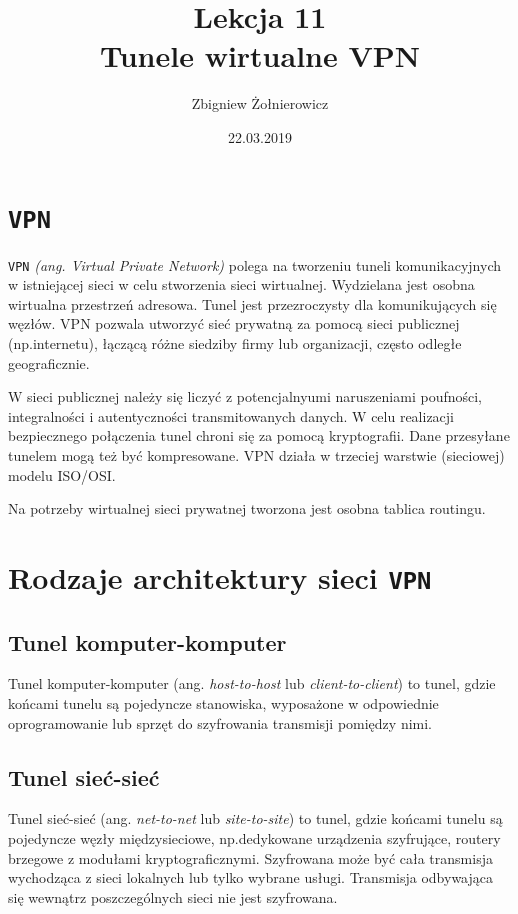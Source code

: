 \documentclass[a4paper]{article}
\begin{document}
\title{
{\huge Lekcja 11} \\
{\large Tunele wirtualne VPN}
}
\author{Zbigniew Żołnierowicz}
\date{22.03.2019}
\maketitle
\section{\tt VPN}
{\tt VPN} \emph{(ang. Virtual Private Network)} polega na tworzeniu tuneli komunikacyjnych
w istniejącej sieci w celu stworzenia sieci wirtualnej. 
Wydzielana jest osobna wirtualna przestrzeń adresowa.
Tunel jest przezroczysty dla komunikujących się węzłów.
VPN pozwala utworzyć sieć prywatną za pomocą sieci publicznej (np.\@ internetu),
łączącą różne siedziby firmy lub organizacji, często odległe geograficznie.

W sieci publicznej należy się liczyć z potencjalnyumi naruszeniami poufności,
integralności i autentyczności transmitowanych danych. W celu realizacji bezpiecznego połączenia
tunel chroni się za pomocą kryptografii.
Dane przesyłane tunelem mogą też być kompresowane.
VPN działa w trzeciej warstwie (sieciowej) modelu ISO/OSI.

Na potrzeby wirtualnej sieci prywatnej tworzona jest osobna tablica routingu.
\section{Rodzaje architektury sieci {\tt VPN}}
\subsection{Tunel komputer-komputer}
Tunel komputer-komputer (ang. \emph{host-to-host} lub \emph{client-to-client}) to tunel, gdzie
końcami tunelu są pojedyncze stanowiska, wyposażone w odpowiednie oprogramowanie lub sprzęt do
szyfrowania transmisji pomiędzy nimi.
\subsection{Tunel sieć-sieć}
Tunel sieć-sieć (ang. \emph{net-to-net} lub \emph{site-to-site}) to tunel, gdzie końcami tunelu
są pojedyncze węzły międzysieciowe, np.\@ dedykowane urządzenia szyfrujące, routery brzegowe
z modułami kryptograficznymi. Szyfrowana może być cała transmisja wychodząca z sieci lokalnych
lub tylko wybrane usługi. Transmisja odbywająca się wewnątrz poszczególnych sieci nie jest
szyfrowana.
\end{document}
